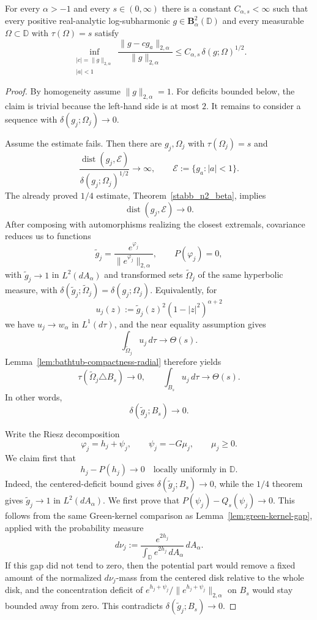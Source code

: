 \documentclass[a4paper,10pt]{amsart}
\newcommand{\D}{\mathbb{D}}
\begin{document}
\begin{numthm}\label{thm:global-half-from-green-absorption}
For every $\alpha>-1$ and every $s\in(0,\infty)$ there is a constant
$C_{\alpha,s}<\infty$ such that every positive real-analytic log-subharmonic
$g\in\mathbf B_\alpha^2(\D)$ and every measurable
$\Omega\subset\D$ with $\tau(\Omega)=s$ satisfy
\[
\inf_{\substack{|c|=\|g\|_{2,\alpha}\\ |a|<1}}
\frac{\|g-cg_a\|_{2,\alpha}}{\|g\|_{2,\alpha}}
\le
C_{\alpha,s}\,\delta(g;\Omega)^{1/2}.
\]
\end{numthm}

\begin{proof}
By homogeneity assume $\|g\|_{2,\alpha}=1$. For deficits bounded below, the
claim is trivial because the left-hand side is at most $2$. It remains to
consider a sequence with $\delta(g_j;\Omega_j)\to0$.

Assume the estimate fails. Then there are $g_j,\Omega_j$ with
$\tau(\Omega_j)=s$ and
\[
\frac{\operatorname{dist}(g_j,\mathcal E)}
{\delta(g_j;\Omega_j)^{1/2}}\to\infty,
\qquad
\mathcal E:=\{g_a:|a|<1\}.
\]
The already proved $1/4$ estimate, Theorem~\ref{stabb_n2_beta}, implies
\[
\operatorname{dist}(g_j,\mathcal E)\to0.
\]
After composing with automorphisms realizing the closest extremals, covariance
reduces us to functions
\[
\widetilde g_j=\frac{e^{\varphi_j}}{\|e^{\varphi_j}\|_{2,\alpha}},
\qquad
P(\varphi_j)=0,
\]
with $\widetilde g_j\to1$ in $L^2(dA_\alpha)$ and transformed sets
$\widetilde\Omega_j$ of the same hyperbolic measure, with
$\delta(\widetilde g_j;\widetilde\Omega_j)=\delta(g_j;\Omega_j)$.
Equivalently, for
\[
u_j(z):=
\widetilde g_j(z)^2(1-|z|^2)^{\alpha+2}
\]
we have $u_j\to w_\alpha$ in $L^1(d\tau)$, and the near equality assumption
gives
\[
\int_{\widetilde\Omega_j}u_j\,d\tau\longrightarrow\Theta(s).
\]
Lemma~\ref{lem:bathtub-compactness-radial} therefore yields
\[
\tau(\widetilde\Omega_j\triangle B_s)\to0,
\qquad
\int_{B_s}u_j\,d\tau\to\Theta(s).
\]
In other words,
\[
\delta(\widetilde g_j;B_s)\to0.
\]

Write the Riesz decomposition
\[
\varphi_j=h_j+\psi_j,\qquad
\psi_j=-G\mu_j,\qquad \mu_j\ge0.
\]
We claim first that
\begin{equation}\label{eq:harmonic-compactness-centered}
h_j-P(h_j)\longrightarrow0
\quad\text{locally uniformly in }\D .
\end{equation}
Indeed, the centered-deficit bound gives
$\delta(\widetilde g_j;B_s)\to0$, while the $1/4$ theorem gives
$\widetilde g_j\to1$ in $L^2(dA_\alpha)$. We first prove that
$P(\psi_j)-Q_s(\psi_j)\to0$. This follows from the same Green-kernel
comparison as Lemma~\ref{lem:green-kernel-gap}, applied with the probability
measure
\[
d\nu_j
:=
\frac{e^{2h_j}}{\int_\D e^{2h_j}\,dA_\alpha}\,dA_\alpha.
\]
If this gap did not tend to zero, then the potential part would remove a fixed
amount of the normalized $d\nu_j$-mass from the centered disk relative to the
whole disk, and the concentration deficit of
$e^{h_j+\psi_j}/\|e^{h_j+\psi_j}\|_{2,\alpha}$ on $B_s$ would stay bounded
away from zero. This contradicts $\delta(\widetilde g_j;B_s)\to0$.


\end{proof}
\end{document}
